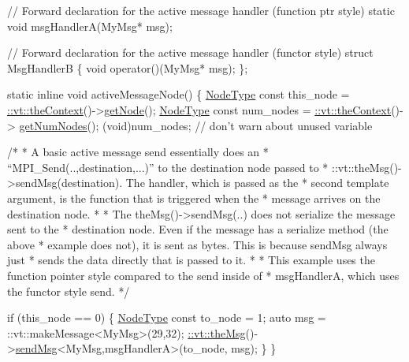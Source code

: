 \begin{DoxyCodeInclude}
\textcolor{comment}{// Forward declaration for the active message handler (function ptr style)}
\textcolor{keyword}{static} \textcolor{keywordtype}{void} msgHandlerA(MyMsg* msg);

\textcolor{comment}{// Forward declaration for the active message handler (functor style)}
\textcolor{keyword}{struct }MsgHandlerB \{
  \textcolor{keywordtype}{void} operator()(MyMsg* msg);
\};

\textcolor{keyword}{static} \textcolor{keyword}{inline} \textcolor{keywordtype}{void} activeMessageNode() \{
  \hyperlink{namespacevt_a866da9d0efc19c0a1ce79e9e492f47e2}{NodeType} \textcolor{keyword}{const} this\_node = \hyperlink{namespacevt_a26551fe0e6e6a1371111df5b12c7e92c}{::vt::theContext}()->\hyperlink{structvt_1_1ctx_1_1_context_a0d52c263ce8516546a67443d9a86fa5f}{getNode}();
  \hyperlink{namespacevt_a866da9d0efc19c0a1ce79e9e492f47e2}{NodeType} \textcolor{keyword}{const} num\_nodes = \hyperlink{namespacevt_a26551fe0e6e6a1371111df5b12c7e92c}{::vt::theContext}()->
      \hyperlink{structvt_1_1ctx_1_1_context_a7f41071aadf6d5fa9e1b6c703c5ff19d}{getNumNodes}();
  (void)num\_nodes;  \textcolor{comment}{// don't warn about unused variable}

  \textcolor{comment}{/*}
\textcolor{comment}{   * A basic active message send essentially does an}
\textcolor{comment}{   * ``MPI\_Send(..,destination,...)'' to the destination node passed to}
\textcolor{comment}{   * ::vt::theMsg()->sendMsg(destination). The handler, which is passed as the}
\textcolor{comment}{   * second template argument, is the function that is triggered when the}
\textcolor{comment}{   * message arrives on the destination node.}
\textcolor{comment}{   *}
\textcolor{comment}{   * The theMsg()->sendMsg(..) does not serialize the message sent to the}
\textcolor{comment}{   * destination node. Even if the message has a serialize method (the above}
\textcolor{comment}{   * example does not), it is sent as bytes. This is because sendMsg always just}
\textcolor{comment}{   * sends the data directly that is passed to it.}
\textcolor{comment}{   *}
\textcolor{comment}{   * This example uses the function pointer style compared to the send inside of}
\textcolor{comment}{   * msgHandlerA, which uses the functor style send.}
\textcolor{comment}{   */}

  \textcolor{keywordflow}{if} (this\_node == 0) \{
    \hyperlink{namespacevt_a866da9d0efc19c0a1ce79e9e492f47e2}{NodeType} \textcolor{keyword}{const} to\_node = 1;
    \textcolor{keyword}{auto} msg = ::vt::makeMessage<MyMsg>(29,32);
    \hyperlink{namespacevt_aeafd31f866aeb4dc6fc2f6ee97136350}{::vt::theMsg}()->\hyperlink{group__preregister_ga0162a39473e7f9b490a79a7983d949ac}{sendMsg}<MyMsg,msgHandlerA>(to\_node, msg);
  \}
\}


\end{DoxyCodeInclude}
